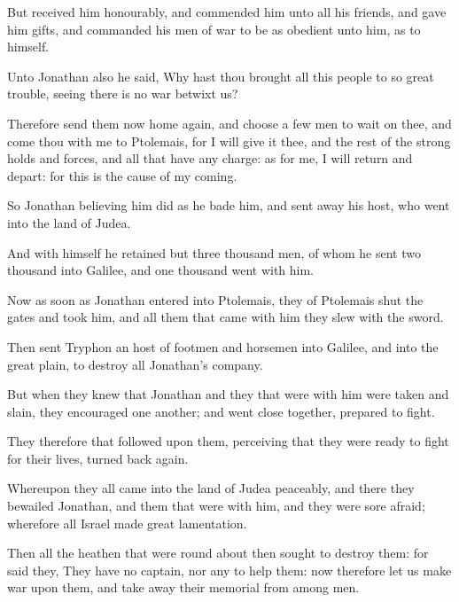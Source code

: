 {\par }{\PP {}But received him honourably, and commended him unto all his friends, and gave him gifts, and commanded his men of war to be as obedient unto him, as to himself.
\par }{\PP {}Unto Jonathan also he said, Why hast thou brought all this people to so great trouble, seeing there is no war betwixt us?
\par }{\PP {}Therefore send them now home again, and choose a few men to wait on thee, and come thou with me to Ptolemais, for I will give it thee, and the rest of the strong holds and forces, and all that have any charge: as for me, I will return and depart: for this is the cause of my coming.
\par }{\PP {}So Jonathan believing him did as he bade him, and sent away his host, who went into the land of Judea.
\par }{\PP {}And with himself he retained but three thousand men, of whom he sent two thousand into Galilee, and one thousand went with him.
\par }{\PP {}Now as soon as Jonathan entered into Ptolemais, they of Ptolemais shut the gates and took him, and all them that came with him they slew with the sword.
\par }{\PP {}Then sent Tryphon an host of footmen and horsemen into Galilee, and into the great plain, to destroy all Jonathan’s company.
\par }{\PP {}But when they knew that Jonathan and they that were with him were taken and slain, they encouraged one another; and went close together, prepared to fight.
\par }{\PP {}They therefore that followed upon them, perceiving that they were ready to fight for their lives, turned back again.
\par }{\PP {}Whereupon they all came into the land of Judea peaceably, and there they bewailed Jonathan, and them that were with him, and they were sore afraid; wherefore all Israel made great lamentation.
\par }{\PP {}Then all the heathen that were round about then sought to destroy them: for said they, They have no captain, nor any to help them: now therefore let us make war upon them, and take away their memorial from among men.

}
